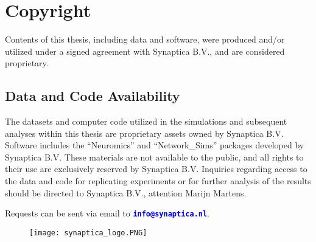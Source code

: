 \section*{Copyright}
Contents of this thesis, including data and software, were produced and/or utilized
under a signed agreement with Synaptica B.V., and are considered proprietary.

\subsection*{Data and Code Availability}
The datasets and computer code utilized in the simulations and subsequent analyses within this thesis
are proprietary assets owned by Synaptica B.V. Software includes the ``Neuromics'' and ``Network\_Sims'' packages
developed by Synaptica B.V. These materials are not available to the public,
and all rights to their use are exclusively reserved by Synaptica B.V.
Inquiries regarding access to the data and code for replicating experiments or for further analysis of
the results should be directed to Synaptica B.V., attention Marijn Martens.
\par
\vspace{12pt} %

\noindent Requests can be sent via email to \textbf{\textcolor{blue}{\texttt{info@synaptica.nl}}}.

\vspace{12pt}

\begin{figure}[h]
    \centering
    \texttt{[image: synaptica\_logo.PNG]}
\end{figure}